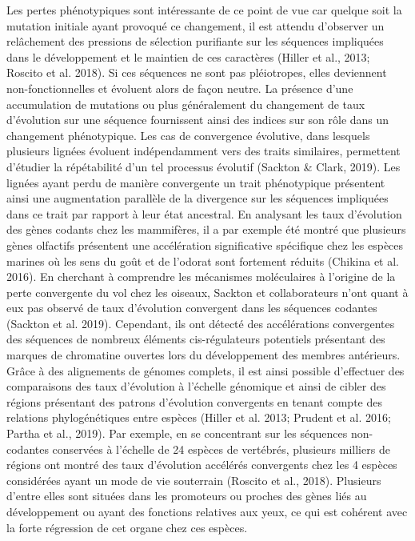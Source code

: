 Les pertes phénotypiques sont intéressante de ce point de vue car quelque soit la mutation initiale ayant provoqué ce changement, il est attendu d’observer un relâchement des pressions de sélection purifiante sur les séquences impliquées dans le développement et le maintien de ces caractères (Hiller et al., 2013; Roscito et al. 2018). Si ces séquences ne sont pas pléiotropes, elles deviennent non-fonctionnelles et évoluent alors de façon neutre. La présence d’une accumulation de mutations ou plus généralement du changement de taux d’évolution sur une séquence fournissent ainsi des indices sur son rôle dans un changement phénotypique. Les cas de convergence évolutive, dans lesquels plusieurs lignées évoluent indépendamment vers des traits similaires, permettent d’étudier la répétabilité d’un tel processus évolutif (Sackton & Clark, 2019). Les lignées ayant perdu de manière convergente un trait phénotypique présentent ainsi une augmentation parallèle de la divergence sur les séquences impliquées dans ce trait par rapport à leur état ancestral. En analysant les taux d’évolution des gènes codants chez les mammifères, il a par exemple été montré que plusieurs gènes olfactifs présentent une accélération significative spécifique chez les espèces marines où les sens du goût et de l’odorat sont fortement réduits (Chikina et al. 2016). En cherchant à comprendre les mécanismes moléculaires à l’origine de la perte convergente du vol chez les oiseaux, Sackton et collaborateurs n’ont quant à eux pas observé de taux d'évolution convergent dans les séquences codantes (Sackton et al. 2019). Cependant, ils ont détecté des accélérations convergentes des séquences de nombreux éléments cis-régulateurs potentiels présentant des marques de chromatine ouvertes lors du développement des membres antérieurs. Grâce à des alignements de génomes complets, il est ainsi possible d’effectuer des comparaisons des taux d’évolution à l’échelle génomique et ainsi de cibler des régions présentant des patrons d’évolution convergents en tenant compte des relations phylogénétiques entre espèces (Hiller et al. 2013; Prudent et al. 2016; Partha et al., 2019). Par exemple, en se concentrant sur les séquences non-codantes conservées à l’échelle de 24 espèces de vertébrés, plusieurs milliers de régions ont montré des taux d’évolution accélérés convergents chez les 4 espèces considérées ayant un mode de vie souterrain (Roscito et al., 2018). Plusieurs d’entre elles sont situées dans les promoteurs ou proches des gènes liés au développement ou ayant des fonctions relatives aux yeux, ce qui est cohérent avec la forte régression de cet organe chez ces espèces. \\

